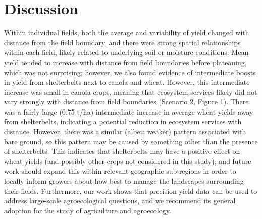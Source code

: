 \documentclass[]{elsarticle} %
\begin{document}
\hypertarget{discussion}{%
\section{Discussion}\label{discussion}}

Within individual fields, both the average and variability of yield changed with distance from the field boundary, and there were strong spatial relationships within each field, likely related to underlying soil or moisture conditions.
Mean yield tended to increase with distance from field boundaries before plateauing, which was not surprising; however, we also found evidence of intermediate boosts in yield from shelterbelts next to canola and wheat.
However, this intermediate increase was small in canola crops, meaning that ecosystem services likely did not vary strongly with distance from field boundaries (Scenario 2, Figure 1).
There was a fairly large (0.75 t/ha) intermediate increase in average wheat yields away from shelterbelts, indicating a potential reduction in ecosystem services with distance.
However, there was a similar (albeit weaker) pattern associated with bare ground, so this pattern may be caused by something other than the presence of shelterbelts.
This indicates that shelterbelts may have a positive effect on wheat yields (and possibly other crops not considered in this study), and future work should expand this within relevant geographic sub-regions in order to locally inform growers about how best to manage the landscapes surrounding their fields.
Furthermore, our work shows that precision yield data can be used to address large-scale agroecological questions, and we recommend its general adoption for the study of agriculture and agroecology.
\end{document}
